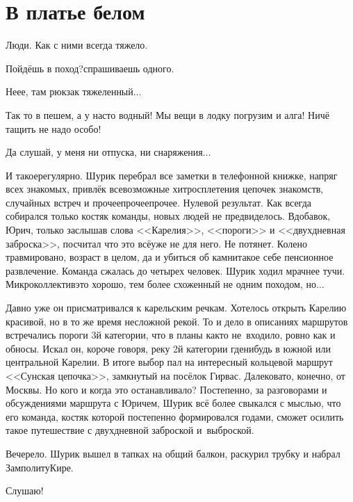 {
\chapter{В платье белом}
\vepsianrose

\fancyhead[LE]{\fancyplain{}{\bfseries \parttitle}}
\fancyhead[RO]{\fancyplain{}{\bfseries \rightmark}}

Люди. Как с ними всегда тяжело.

\diagdash Пойдёшь в поход?\mdash спрашиваешь одного.

\diagdash Не\sdash е\sdash е, там рюкзак тяжеленный$\ldots$

\diagdash Так то в пешем, а у нас\sdash то водный! Мы вещи в лодку погрузим и алга! Ничё тащить не надо особо!

\diagdash Да слушай, у меня ни отпуска, ни снаряжения$\ldots$

И такое\mdash регулярно. Шурик перебрал все заметки в телефонной книжке, напряг всех знакомых, привлёк всевозможные хитросплетения цепочек знакомств, случайных встреч и прочее\sdash прочее\sdash прочее. Нулевой результат. Как всегда собирался только костяк команды, новых людей не предвиделось. Вдобавок, Юрич, только заслышав слова <<Карелия>>, <<пороги>> и <<двухдневная заброска>>, посчитал что это всё\mdash уже не для него. Не потянет. Колено травмировано, возраст в целом, да и убиться об камни\mdash такое себе пенсионное развлечение. Команда сжалась до четырех человек. Шурик ходил мрачнее тучи. Микроколлектив\mdash это хорошо, тем более схоженный не одним походом, но$\ldots$

Давно уже он присматривался к карельским речкам. Хотелось открыть Карелию красивой, но в то же время несложной рекой. То и дело в описаниях маршрутов встречались пороги 3\sdash й категории, что в планы как\sdash то не~входило, ровно как и обносы. Искал он, короче говоря, реку 2\sdash й категории где\sdash нибудь в южной или центральной Карелии. В итоге выбор пал на интересный кольцевой маршрут <<Сунская цепочка>>, замкнутый на посёлок Гирвас. Далековато, конечно, от Москвы. Но кого и когда это останавливало? Постепенно, за разговорами и обсуждениями маршрута с Юричем, Шурик всё более свыкался с мыслью, что его команда, костяк которой постепенно формировался годами, сможет осилить такое путешествие с двухдневной заброской и~выброской. 

Вечерело. Шурик вышел в тапках на общий балкон, раскурил трубку и набрал Замполиту\mdash Кире.

\diagdash Слушаю!

}
